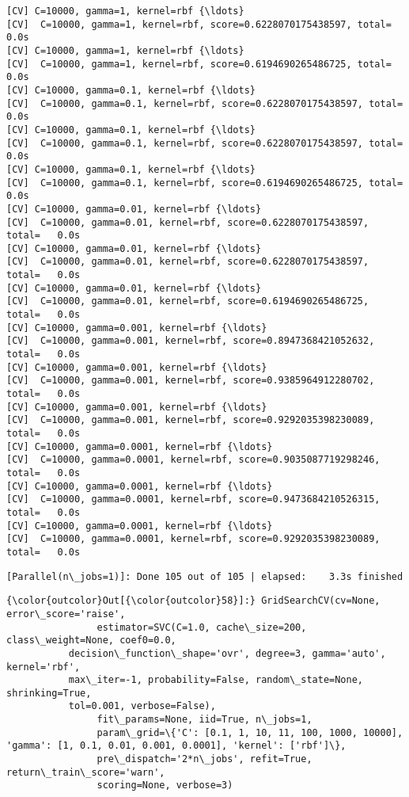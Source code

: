 \documentclass[11pt]{article}
\begin{document}
\begin{Verbatim}[commandchars=\\\{\}]
[CV] C=10000, gamma=1, kernel=rbf {\ldots}
[CV]  C=10000, gamma=1, kernel=rbf, score=0.6228070175438597, total=   0.0s
[CV] C=10000, gamma=1, kernel=rbf {\ldots}
[CV]  C=10000, gamma=1, kernel=rbf, score=0.6194690265486725, total=   0.0s
[CV] C=10000, gamma=0.1, kernel=rbf {\ldots}
[CV]  C=10000, gamma=0.1, kernel=rbf, score=0.6228070175438597, total=   0.0s
[CV] C=10000, gamma=0.1, kernel=rbf {\ldots}
[CV]  C=10000, gamma=0.1, kernel=rbf, score=0.6228070175438597, total=   0.0s
[CV] C=10000, gamma=0.1, kernel=rbf {\ldots}
[CV]  C=10000, gamma=0.1, kernel=rbf, score=0.6194690265486725, total=   0.0s
[CV] C=10000, gamma=0.01, kernel=rbf {\ldots}
[CV]  C=10000, gamma=0.01, kernel=rbf, score=0.6228070175438597, total=   0.0s
[CV] C=10000, gamma=0.01, kernel=rbf {\ldots}
[CV]  C=10000, gamma=0.01, kernel=rbf, score=0.6228070175438597, total=   0.0s
[CV] C=10000, gamma=0.01, kernel=rbf {\ldots}
[CV]  C=10000, gamma=0.01, kernel=rbf, score=0.6194690265486725, total=   0.0s
[CV] C=10000, gamma=0.001, kernel=rbf {\ldots}
[CV]  C=10000, gamma=0.001, kernel=rbf, score=0.8947368421052632, total=   0.0s
[CV] C=10000, gamma=0.001, kernel=rbf {\ldots}
[CV]  C=10000, gamma=0.001, kernel=rbf, score=0.9385964912280702, total=   0.0s
[CV] C=10000, gamma=0.001, kernel=rbf {\ldots}
[CV]  C=10000, gamma=0.001, kernel=rbf, score=0.9292035398230089, total=   0.0s
[CV] C=10000, gamma=0.0001, kernel=rbf {\ldots}
[CV]  C=10000, gamma=0.0001, kernel=rbf, score=0.9035087719298246, total=   0.0s
[CV] C=10000, gamma=0.0001, kernel=rbf {\ldots}
[CV]  C=10000, gamma=0.0001, kernel=rbf, score=0.9473684210526315, total=   0.0s
[CV] C=10000, gamma=0.0001, kernel=rbf {\ldots}
[CV]  C=10000, gamma=0.0001, kernel=rbf, score=0.9292035398230089, total=   0.0s

    \end{Verbatim}

    \begin{Verbatim}[commandchars=\\\{\}]
[Parallel(n\_jobs=1)]: Done 105 out of 105 | elapsed:    3.3s finished

    \end{Verbatim}

\begin{Verbatim}[commandchars=\\\{\}]
{\color{outcolor}Out[{\color{outcolor}58}]:} GridSearchCV(cv=None, error\_score='raise',
                estimator=SVC(C=1.0, cache\_size=200, class\_weight=None, coef0=0.0,
           decision\_function\_shape='ovr', degree=3, gamma='auto', kernel='rbf',
           max\_iter=-1, probability=False, random\_state=None, shrinking=True,
           tol=0.001, verbose=False),
                fit\_params=None, iid=True, n\_jobs=1,
                param\_grid=\{'C': [0.1, 1, 10, 11, 100, 1000, 10000], 'gamma': [1, 0.1, 0.01, 0.001, 0.0001], 'kernel': ['rbf']\},
                pre\_dispatch='2*n\_jobs', refit=True, return\_train\_score='warn',
                scoring=None, verbose=3)
\end{Verbatim}
            
\end{document}
